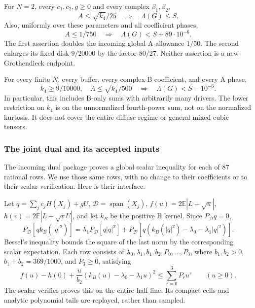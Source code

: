\begin{theorem}
\label{thm:k-joint-dual-two}
For $N=2$, every $c_1,c_2,g\ge0$ and every complex $\beta_1,\beta_2$,
\[
 \boxed{A\le\sqrt{k_4}/25\quad\Longrightarrow\quad\Lambda(G)\le S.}
\]
Also, uniformly over these parameters and all coefficient phases,
\[
 \boxed{A\le1/750\quad\Longrightarrow\quad
                    \Lambda(G)<S+89\cdot10^{-6}.}
\]
The first assertion doubles the incoming global A allowance $1/50$.
The second enlarges its fixed disk $9/20000$ by the factor $80/27$.
Neither assertion is a new Grothendieck endpoint.
\end{theorem}

\begin{theorem}
\label{thm:k-joint-dual-many}
For every finite $N$, every buffer, every complex B coefficient, and
every A phase,
\[
 \boxed{k_4\ge9/10000,\quad A\le\sqrt{k_4}/500
             \quad\Longrightarrow\quad\Lambda(G)<S-10^{-6}.}
\]
In particular, this includes B-only sums with arbitrarily many drivers.
The lower restriction on $k_4$ is on the unnormalized fourth-power
sum, not on the normalized kurtosis. It does not cover the entire
diffuse regime or general mixed cubic tensors.
\end{theorem}

\subsubsection{The joint dual and its accepted inputs}
The incoming dual package proves a global scalar inequality for each
of 87 rational rows. We use those same rows, with no change to their
coefficients or to their scalar verification. Here is their interface.

Let $q=\sum_jc_jH(X_j)+gU$, $\mathcal D=\operatorname{span}(X_j)$,
$f(u)=2\mathbb E|L+\sqrt u|$, $h(v)=2\mathbb E|L+\sqrt vU|$,
and let $k_B$ be the positive B kernel. Since $P_{\mathcal D}q=0$,
\[
 P_{\mathcal D}[qk_B(|q|^2)]
   =\lambda_1P_{\mathcal D}[q|q|^2]
      +P_{\mathcal D}[q(k_B(|q|^2)-\lambda_0-\lambda_1|q|^2)].
\]
Bessel's inequality bounds the square of the last norm by the
corresponding scalar expectation. Each row consists of
$\lambda_0,\lambda_1,b_1,b_2,P_0,\ldots,P_3$, where
$b_1,b_2>0$, $b_1+b_2=369/1000$, and $P_3\ge0$, satisfying
\[
 f(u)-h(0)+\frac{u}{b_2}(k_B(u)-\lambda_0-\lambda_1u)^2
       \le \sum_{r=0}^3P_ru^r\qquad(u\ge0).
\]
The scalar verifier proves this on the entire half-line. Its compact
cells and analytic polynomial tails are replayed, rather than sampled.

